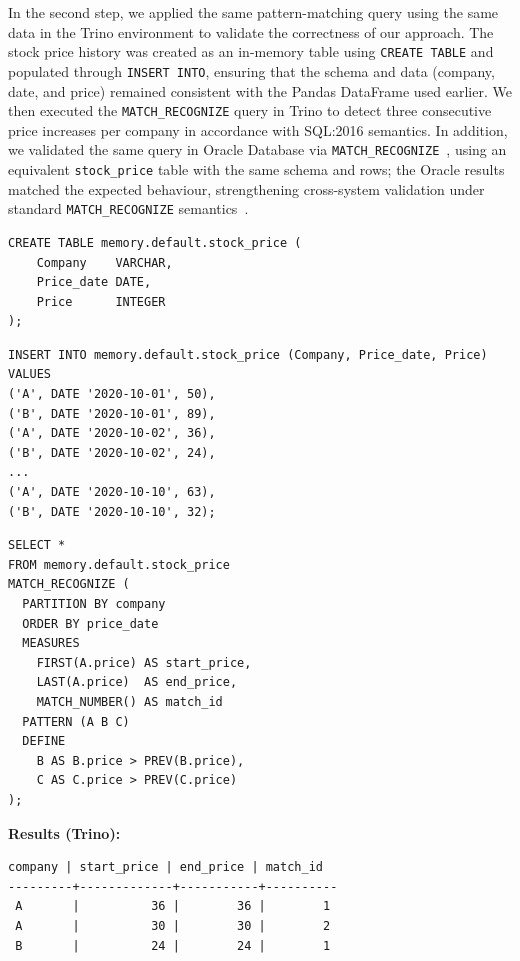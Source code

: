In the second step, we applied the same pattern-matching query using the
same data in the Trino environment to validate the correctness of our
approach.  The stock price history was created as an in-memory table
using \texttt{CREATE TABLE} and populated through \texttt{INSERT INTO},
ensuring that the schema and data (company, date, and price) remained
consistent with the Pandas DataFrame used earlier.  We then executed
the \texttt{MATCH\_RECOGNIZE} query in Trino to detect three consecutive
price increases per company in accordance with SQL:2016 semantics.  In
addition, we validated the same query in Oracle Database via
\texttt{MATCH\_RECOGNIZE}~\cite{petkovic2022rpr,monierashraf2025oracle},
using an equivalent \texttt{stock\_price} table with the same schema and
rows; the Oracle results matched the expected behaviour, strengthening
cross-system validation under standard \texttt{MATCH\_RECOGNIZE}
semantics~\cite{monierashraf2025oracle}.

\begin{lstlisting}[basicstyle=\ttfamily\small,
  backgroundcolor=\color{gray!10},
  caption={[Create table in Trino]Creating the in-memory table in Trino.}]
CREATE TABLE memory.default.stock_price (
    Company    VARCHAR,
    Price_date DATE,
    Price      INTEGER
);
\end{lstlisting}

\begin{lstlisting}[basicstyle=\ttfamily\small,
  backgroundcolor=\color{gray!10},
  caption={[Insert rows in Trino]Inserting data into the table.}]
INSERT INTO memory.default.stock_price (Company, Price_date, Price) VALUES
('A', DATE '2020-10-01', 50),
('B', DATE '2020-10-01', 89),
('A', DATE '2020-10-02', 36),
('B', DATE '2020-10-02', 24),
...
('A', DATE '2020-10-10', 63),
('B', DATE '2020-10-10', 32);
\end{lstlisting}

\begin{lstlisting}[basicstyle=\ttfamily\small,
  backgroundcolor=\color{gray!10},
  caption={[Execute MATCH\_RECOGNIZE in Trino]Executing the same \texttt{MATCH\_RECOGNIZE} query in Trino.}]
SELECT *
FROM memory.default.stock_price
MATCH_RECOGNIZE (
  PARTITION BY company
  ORDER BY price_date
  MEASURES
    FIRST(A.price) AS start_price,
    LAST(A.price)  AS end_price,
    MATCH_NUMBER() AS match_id
  PATTERN (A B C)
  DEFINE
    B AS B.price > PREV(B.price),
    C AS C.price > PREV(C.price)
);
\end{lstlisting}

\noindent\textbf{Results (Trino):}
\begin{lstlisting}[basicstyle=\ttfamily\small, backgroundcolor=\color{gray!10}]
 company | start_price | end_price | match_id
---------+-------------+-----------+----------
 A       |          36 |        36 |        1
 A       |          30 |        30 |        2
 B       |          24 |        24 |        1
\end{lstlisting}

